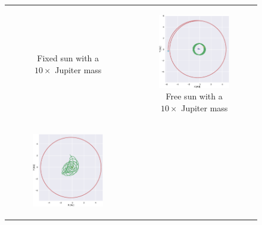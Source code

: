\documentclass[aps,reprint]{revtex4-1}
\begin{document}
\begin{figure}
\begin{tabular}{cc}
\begin{subfigure}[b]{0.5\columnwidth}
        \caption{Fixed sun with a \(10\times\) Jupiter mass}
        \label{fix10}
    \end{subfigure}&
    \begin{subfigure}[b]{0.5\columnwidth}
        \includegraphics[width=\columnwidth]{figures/jupiter2_10.eps}
        \caption{Free sun with a \(10\times\) Jupiter mass}
        \label{free10}
    \end{subfigure}\\
    \begin{subfigure}[b]{0.5\columnwidth}
        \includegraphics[width=\columnwidth]{figures/jupiter_100.eps}

\end{subfigure}
\end{tabular}
\end{figure}
\end{document}
